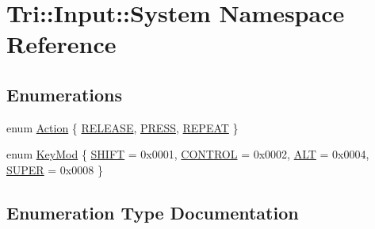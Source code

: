 \hypertarget{namespace_tri_1_1_input_1_1_system}{}\section{Tri\+:\+:Input\+:\+:System Namespace Reference}
\label{namespace_tri_1_1_input_1_1_system}
\subsection*{Enumerations}
\begin{DoxyCompactItemize}
\item 
enum \hyperlink{namespace_tri_1_1_input_1_1_system_a79600e9f4ed835251eed1706ce96bed0}{Action} \{ \hyperlink{namespace_tri_1_1_input_1_1_system_a79600e9f4ed835251eed1706ce96bed0a7727d453d556277b17fb8d2607be7b28}{R\+E\+L\+E\+A\+S\+E}, 
\hyperlink{namespace_tri_1_1_input_1_1_system_a79600e9f4ed835251eed1706ce96bed0addc6497ae72c2783c423cdafd5cc4765}{P\+R\+E\+S\+S}, 
\hyperlink{namespace_tri_1_1_input_1_1_system_a79600e9f4ed835251eed1706ce96bed0ae8c5d5336a4eb019274523e272f48eab}{R\+E\+P\+E\+A\+T}
 \}
\item 
enum \hyperlink{namespace_tri_1_1_input_1_1_system_a625d0a4251a9f498ce2ed509836fa061}{Key\+Mod} \{ \hyperlink{namespace_tri_1_1_input_1_1_system_a625d0a4251a9f498ce2ed509836fa061a1c81d1fa5f9347462dce359a8ccf60e5}{S\+H\+I\+F\+T} = 0x0001, 
\hyperlink{namespace_tri_1_1_input_1_1_system_a625d0a4251a9f498ce2ed509836fa061a9875848a7fa150e45e9a9c2a6c230528}{C\+O\+N\+T\+R\+O\+L} = 0x0002, 
\hyperlink{namespace_tri_1_1_input_1_1_system_a625d0a4251a9f498ce2ed509836fa061aba00dc21fdc7095641361049922641a8}{A\+L\+T} = 0x0004, 
\hyperlink{namespace_tri_1_1_input_1_1_system_a625d0a4251a9f498ce2ed509836fa061a3ce666d487912fef62a06200608a69f0}{S\+U\+P\+E\+R} = 0x0008
 \}
\end{DoxyCompactItemize}


\subsection{Enumeration Type Documentation}
\hypertarget{namespace_tri_1_1_input_1_1_system_a79600e9f4ed835251eed1706ce96bed0}{}
